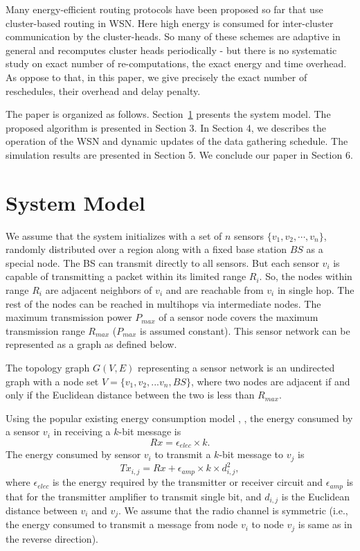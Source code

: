 \documentclass[10pt]{llncs}
\begin{document}
Many energy-efficient routing protocols have been proposed so far that use cluster-based routing \cite{Dimokas10} \cite{Dahnil12} \cite{Aslam11} \cite{Chamam09} in WSN. Here high energy is consumed for inter-cluster communication by the cluster-heads. So many of these schemes are adaptive in general and recomputes cluster heads periodically - but there is no systematic study on exact number of re-computations, the exact energy and time overhead. As oppose to that, in this paper, we give precisely the exact number of reschedules, their overhead and delay penalty.

The paper is organized as follows. Section~\ref{sec:SystemModel} presents the system model. The proposed algorithm is presented in Section 3. In Section 4, we describes the operation of the WSN and dynamic updates of the data gathering schedule. The simulation results are presented in Section 5. We conclude our paper in Section 6.

\section{System Model}\label{sec:SystemModel}

We assume that the system initializes with a set of $n$ sensors $\{v_1, v_2, \cdots, v_n\}$, randomly distributed over a region along with a fixed base station $BS$ as a special node. The BS can transmit directly to all sensors. But each sensor $v_i$ is capable of transmitting a packet within its limited range $R_i$. So, the nodes within range $R_i$ are adjacent neighbors of $v_i$ and are reachable from $v_i$ in single hop. The rest of the nodes can be reached in multihops via intermediate nodes. The maximum transmission power $P_{max}$ of a sensor node covers the maximum transmission range $R_{max}$ ($P_{max}$ is assumed constant). This sensor network can be represented as a graph as defined below.

\begin{definition}
The topology graph $G(V, E)$ representing a sensor network is an undirected graph with a node set $V = \{v_1, v_2,...v_n, BS\}$, where  two nodes are adjacent if and only if the Euclidean distance between the two is less than $R_{max}$.
\end{definition}

Using the popular existing energy consumption model \cite{Heinzelman00}, \cite{Lindsey01}, the energy consumed by a sensor $v_i$ in receiving a $k$-bit message is $$Rx = \epsilon_{elec} \times k.$$ The energy consumed by sensor $v_i$ to transmit a $k$-bit message to $v_j$ is $$Tx_{i,j} = Rx + \epsilon_{amp} \times k \times d_{i,j}^2,$$ where $\epsilon_{elec}$ is the energy required by the transmitter or receiver circuit and $\epsilon_{amp}$ is that for the transmitter amplifier to transmit single bit, and $d_{i,j}$ is the Euclidean distance between $v_i$ and $v_j$. We assume that the radio channel is symmetric (i.e., the energy consumed to transmit a message from node $v_i$ to node $v_j$ is same as in the reverse direction). 
\end{document}
